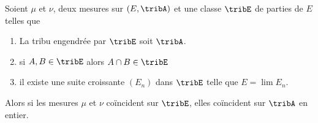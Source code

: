 \begin{theorem} \label{ThoJDYlsXu}
    Soient \( \mu\) et \( \nu\), deux mesures sur \( (E,\tribA)\) et une classe \( \tribE\) de parties de \( E\) telles que
    \begin{enumerate}
        \item
            La tribu engendrée par \( \tribE\) soit \( \tribA\).
        \item
            si \( A,B\in\tribE\) alors \( A\cap B\in\tribE\)
        \item
            il existe une suite croissante \( (E_n)\) dans \( \tribE\) telle que \( E=\lim E_n\).
    \end{enumerate}
    Alors si les mesures \( \mu\) et \( \nu\) coïncident sur \( \tribE\), elles coïncident sur \( \tribA\) en entier.
\end{theorem}

